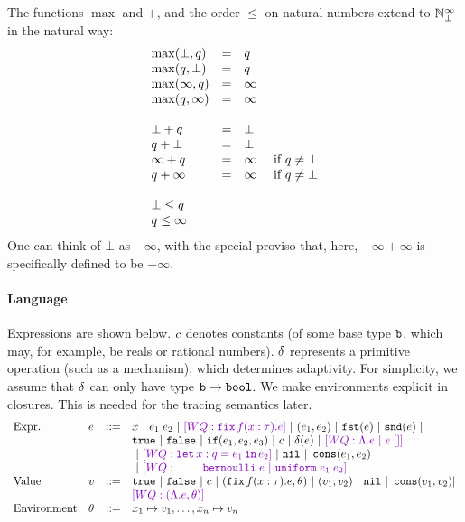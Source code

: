 \documentclass[a4paper,11pt]{article}
\newcommand{\wq}[1]{\textcolor[rgb]{.50,0.0,0.7}{[WQ: #1]}}
\theoremstyle{definition}
\begin{document}
The functions $\max$ and $+$, and the order $\leq$ on natural numbers
extend to $\mathbb{N}_{\bot}^\infty$ in the natural way:
\[\begin{array}{lcl}
\max(\bot, \nnatbiA) & = & \nnatbiA \\
\max(\nnatbiA, \bot) & = & \nnatbiA \\
\max(\infty, \nnatbiA) & = & \infty \\
\max(\nnatbiA, \infty) & = & \infty \\
\\
%
\bot + \nnatbiA & = & \bot \\
\nnatbiA + \bot & = & \bot \\
\infty + \nnatbiA & = & \infty ~~~~ \mbox{if } \nnatbiA \neq \bot \\
\nnatbiA + \infty & = & \infty ~~~~ \mbox{if } \nnatbiA \neq \bot \\
\\
%
\bot \leq \nnatbiA \\
\nnatbiA \leq \infty
\end{array}
\]
One can think of $\bot$ as $-\infty$, with the special proviso that,
here, $-\infty + \infty$ is specifically defined to be $-\infty$.

\paragraph{Language}
Expressions are shown below. $c$ denotes constants (of some base
type $\mathtt{b}$, which may, for example, be reals or rational
numbers). $\delta$ represents a primitive operation (such as a
mechanism), which determines adaptivity. For simplicity, we assume
that $\delta$ can only have type $\mathtt{b} \to \mathtt{bool}$. We make
environments explicit in closures. This is needed for the tracing
semantics later.
\[\begin{array}{llll}
\mbox{Expr.} & \expr & ::= & x ~|~ \expr_1 \eapp \expr_2 ~|~ \wq{\efix f(x:\type).\expr}
 ~|~ (\expr_1, \expr_2) ~|~ \eprojl(\expr) ~|~ \eprojr(\expr) ~| \\
%
& & & \etrue ~|~ \efalse ~|~ \eif(\expr_1, \expr_2, \expr_3) ~|~
\econst ~|~ \eop(\expr)  ~|~ \wq {\eilam \expr ~|~ \expr \eapp [] } \\
& & & ~|~ \wq {\elet  x:q = \expr_1 \ein \expr_2 } ~|~ \enil ~|~  \econs (
      \expr_1, \expr_2) \\
& & & ~|~ \wq{ ~~~~~~~
 \bernoulli \eapp \expr ~|~ \uniform \eapp \expr_1 \eapp
      \expr_2 } \\
%
\mbox{Value} & \valr & ::= & \etrue ~|~ \efalse ~|~ \econst ~|~
(\efix f(x:\type).\expr, \env) ~|~ (\valr_1, \valr_2) 
    ~|~ \enil ~|~ \econs (\valr_1, \valr_2) | \\
& & & \wq {(\eilam \expr , \env) } \\ 
%
\mbox{Environment} & \env & ::= & x_1 \mapsto \valr_1, \ldots, x_n \mapsto \valr_n
\end{array}\]
\end{document}
